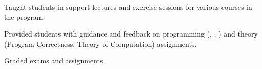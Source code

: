 \begin{cventries}
{\begin{cvitems}
		\item Taught students in support lectures and exercise sessions for various courses in the program.
		\item Provided students with guidance and feedback on programming (, , ) and theory\\ (Program Correctness, Theory of Computation) assignments.
		\item Graded exams and assignments.
		\end{cvitems}
	}
\end{cventries}
